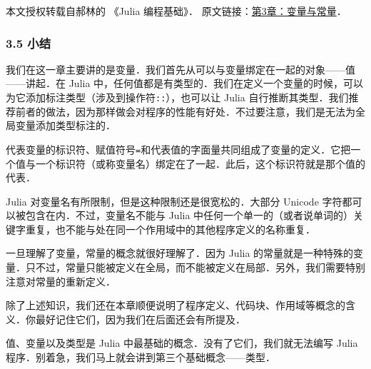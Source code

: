 
本文授权转载自郝林的 《Julia 编程基础》． 原文链接：\href{https://github.com/hyper0x/JuliaBasics/blob/master/book/ch03.md}{第3章：变量与常量}．


\subsubsection{3.5 小结}

我们在这一章主要讲的是变量．我们首先从可以与变量绑定在一起的对象——值——讲起．在 Julia 中，任何值都是有类型的．我们在定义一个变量的时候，可以为它添加标注类型（涉及到操作符\verb|::|），也可以让 Julia 自行推断其类型．我们推荐前者的做法，因为那样做会对程序的性能有好处．不过要注意，我们是无法为全局变量添加类型标注的．

代表变量的标识符、赋值符号\verb|=|和代表值的字面量共同组成了变量的定义．它把一个值与一个标识符（或称变量名）绑定在了一起．此后，这个标识符就是那个值的代表．

Julia 对变量名有所限制，但是这种限制还是很宽松的．大部分 Unicode 字符都可以被包含在内．不过，变量名不能与 Julia 中任何一个单一的（或者说单词的）关键字重复，也不能与处在同一个作用域中的其他程序定义的名称重复．

一旦理解了变量，常量的概念就很好理解了．因为 Julia 的常量就是一种特殊的变量．只不过，常量只能被定义在全局，而不能被定义在局部．另外，我们需要特别注意对常量的重新定义．

除了上述知识，我们还在本章顺便说明了程序定义、代码块、作用域等概念的含义．你最好记住它们，因为我们在后面还会有所提及．

值、变量以及类型是 Julia 中最基础的概念．没有了它们，我们就无法编写 Julia 程序．别着急，我们马上就会讲到第三个基础概念——类型．
